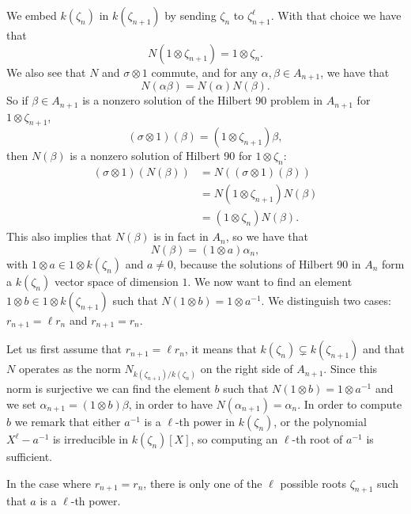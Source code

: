 \documentclass[a4paper,11pt]{article}
\begin{document}
We embed $k(\zeta_n)$ in $k(\zeta_{n+1})$ by sending $\zeta_n$ to
$\zeta_{n+1}^\ell$. With that choice we have that
\[
  N(1\otimes\zeta_{n+1})=1\otimes\zeta_n.
\]
We also see that $N$ and $\sigma\otimes1$ commute, and for any $\alpha,
\beta\in A_{n+1}$, we have that \[
  N(\alpha\beta) = N(\alpha)N(\beta).
\]
So if $\beta\in A_{n+1}$ is a nonzero solution of the Hilbert 90 problem in $A_{n+1}$ for
$1\otimes\zeta_{n+1}$, \ie
\[
  (\sigma\otimes 1)(\beta) = (1\otimes\zeta_{n+1})\beta,
\]
then $N(\beta)$ is a nonzero solution of Hilbert 90 for $1\otimes\zeta_n$:
\begin{align*}
  (\sigma\otimes1)(N(\beta)) &= N((\sigma\otimes1)(\beta)) \\
  &= N(1\otimes\zeta_{n+1})N(\beta) \\
  &= (1\otimes\zeta_n)N(\beta).
\end{align*}
This also implies that $N(\beta)$ is in fact in $A_n$, so we have that
\[
  N(\beta) = (1\otimes a)\alpha_n,
\]
with $1\otimes a\in 1\otimes k(\zeta_n)$ and $a\neq0$, because the solutions of Hilbert 90 in $A_n$
form a $k(\zeta_n)$ vector space of dimension $1$. We now want to find an
element $1\otimes b\in1\otimes k(\zeta_{n+1})$ such that $N(1\otimes b)=1\otimes a^{-1}$. We distinguish two
cases: $r_{n+1}=\ell r_n$ and $r_{n+1}=r_n$.

Let us first assume that $r_{n+1}=\ell r_n$, it means that $k(\zeta_n)\subsetneq
k(\zeta_{n+1})$ and that $N$ operates as the norm
$N_{k(\zeta_{n+1})/k(\zeta_n)}$ on the right side of $A_{n+1}$. Since this norm
is surjective we can find the  element $b$ such that $N(1\otimes b)=1\otimes a^{-1}$ and
we set $\alpha_{n+1}= (1\otimes b)\beta$, in order to have
$N(\alpha_{n+1})=\alpha_n$. In order to compute $b$ we remark that either
$a^{-1}$ is a $\ell$-th power in $k(\zeta_n)$, or the polynomial
$X^\ell-a^{-1}$ is irreducible in $k(\zeta_n)[X]$, so computing an $\ell$-th
root of $a^{-1}$ is sufficient.

In the case where $r_{n+1}=r_n$, there is only one of the $\ell$ possible roots
$\zeta_{n+1}$ such that $a$ is a $\ell$-th power.
\end{document}
